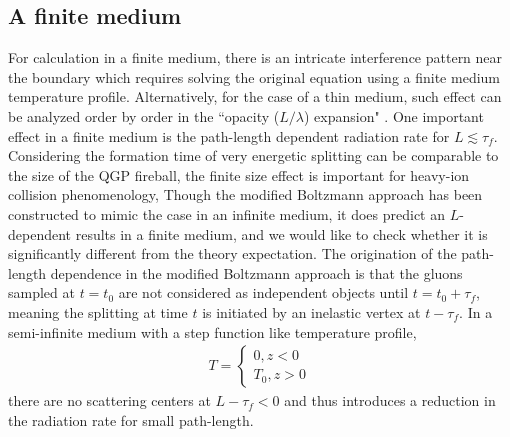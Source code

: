 \documentclass[aps, prc, reprint, amsmath, groupedaddress, nofootinbib]{revtex4-1}
\begin{document}
\subsection{A finite medium}
For calculation in a finite medium, there is an intricate interference pattern near the boundary which requires solving the original equation using a finite medium temperature profile. 
Alternatively, for the case of a thin medium, such effect can be analyzed order by order in the ``opacity ($L/\lambda$) expansion" \cite{Wiedemann:2000za,Gyulassy:1999zd}. 
One important effect in a finite medium is the path-length dependent radiation rate for $L \lesssim \tau_f$. Considering the formation time of very energetic splitting can be comparable to the size of the QGP fireball, the finite size effect is important for heavy-ion collision phenomenology,
Though the modified Boltzmann approach has been constructed to mimic the case in an infinite medium, it does predict an $L$-dependent results in a finite medium, and we would like to check whether it is significantly different from the theory expectation.
The origination of the path-length dependence in the modified Boltzmann approach is that the gluons sampled at $t=t_0$ are not considered as independent objects until $t = t_0+\tau_f$, meaning the splitting at time $t$ is initiated by an inelastic vertex at $t-\tau_f$.
In a semi-infinite medium with a step function like temperature profile, 
\begin{eqnarray}
T = \begin{cases}
0 , z<0\\
T_0, z>0
\end{cases}
\end{eqnarray}
there are no scattering centers at $L-\tau_f<0$ and thus introduces a reduction in the radiation rate for small path-length.
\end{document}

